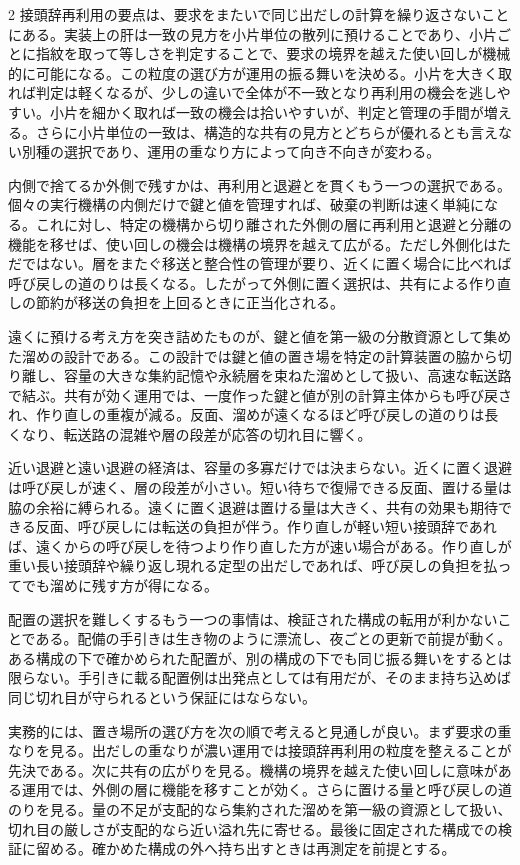 \documentclass[lualatex,a4paper,10pt]{jlreq}
\begin{document}
\begin{multicols}{2}
接頭辞再利用の要点は、要求をまたいで同じ出だしの計算を繰り返さないことにある。実装上の肝は一致の見方を小片単位の散列に預けることであり、小片ごとに指紋を取って等しさを判定することで、要求の境界を越えた使い回しが機械的に可能になる。この粒度の選び方が運用の振る舞いを決める。小片を大きく取れば判定は軽くなるが、少しの違いで全体が不一致となり再利用の機会を逃しやすい。小片を細かく取れば一致の機会は拾いやすいが、判定と管理の手間が増える。さらに小片単位の一致は、構造的な共有の見方とどちらが優れるとも言えない別種の選択であり、運用の重なり方によって向き不向きが変わる\autocite{vllmprefix}。

内側で捨てるか外側で残すかは、再利用と退避とを貫くもう一つの選択である。個々の実行機構の内側だけで鍵と値を管理すれば、破棄の判断は速く単純になる。これに対し、特定の機構から切り離された外側の層に再利用と退避と分離の機能を移せば、使い回しの機会は機構の境界を越えて広がる。ただし外側化はただではない。層をまたぐ移送と整合性の管理が要り、近くに置く場合に比べれば呼び戻しの道のりは長くなる。したがって外側に置く選択は、共有による作り直しの節約が移送の負担を上回るときに正当化される\autocite{lmcache}。

遠くに預ける考え方を突き詰めたものが、鍵と値を第一級の分散資源として集めた溜めの設計である。この設計では鍵と値の置き場を特定の計算装置の脇から切り離し、容量の大きな集約記憶や永続層を束ねた溜めとして扱い、高速な転送路で結ぶ。共有が効く運用では、一度作った鍵と値が別の計算主体からも呼び戻され、作り直しの重複が減る。反面、溜めが遠くなるほど呼び戻しの道のりは長くなり、転送路の混雑や層の段差が応答の切れ目に響く\autocite{mooncake}。

近い退避と遠い退避の経済は、容量の多寡だけでは決まらない。近くに置く退避は呼び戻しが速く、層の段差が小さい。短い待ちで復帰できる反面、置ける量は脇の余裕に縛られる。遠くに置く退避は置ける量は大きく、共有の効果も期待できる反面、呼び戻しには転送の負担が伴う。作り直しが軽い短い接頭辞であれば、遠くからの呼び戻しを待つより作り直した方が速い場合がある。作り直しが重い長い接頭辞や繰り返し現れる定型の出だしであれば、呼び戻しの負担を払ってでも溜めに残す方が得になる\autocite{lmcache}\autocite{mooncake}\autocite{vllmprefix}。

配置の選択を難しくするもう一つの事情は、検証された構成の転用が利かないことである。配備の手引きは生き物のように漂流し、夜ごとの更新で前提が動く。ある構成の下で確かめられた配置が、別の構成の下でも同じ振る舞いをするとは限らない。手引きに載る配置例は出発点としては有用だが、そのまま持ち込めば同じ切れ目が守られるという保証にはならない\autocite{vllmrecipe}。

実務的には、置き場所の選び方を次の順で考えると見通しが良い。まず要求の重なりを見る。出だしの重なりが濃い運用では接頭辞再利用の粒度を整えることが先決である\autocite{vllmprefix}。次に共有の広がりを見る。機構の境界を越えた使い回しに意味がある運用では、外側の層に機能を移すことが効く\autocite{lmcache}。さらに置ける量と呼び戻しの道のりを見る。量の不足が支配的なら集約された溜めを第一級の資源として扱い、切れ目の厳しさが支配的なら近い溢れ先に寄せる\autocite{mooncake}。最後に固定された構成での検証に留める。確かめた構成の外へ持ち出すときは再測定を前提とする\autocite{vllmrecipe}。


\end{multicols}
\end{document}
